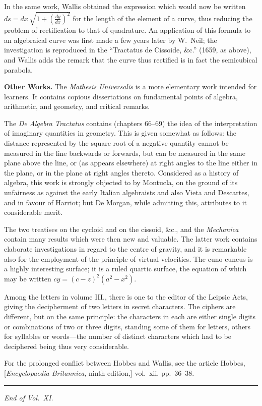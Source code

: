 \documentclass[11pt,a4paper]{article}
\begin{document}
In the same work, Wallis obtained the expression which would now be written $ds = dx\,\sqrt{1 + (\frac{dy}{dx})^{2}}$ for the length of the element of a curve, thus reducing the problem of rectification to that of quadrature. An application of this formula to an algebraical curve was first made a few years later by W.~Neil; the investigation is reproduced in the ``Tractatus de Cissoide, \&c.'' (1659, as above), and Wallis adds the remark that the curve thus rectified is in fact the semicubical parabola.

\textbf{Other Works.}\quad
The \textit{Mathesis Universalis} is a more elementary work intended for learners. It contains copious dissertations on fundamental points of algebra, arithmetic, and geometry, and critical remarks.

The \textit{De Algebra Tractatus} contains (chapters 66--69) the idea of the interpretation of imaginary quantities in geometry. This is given somewhat as follows: the distance represented by the square root of a negative quantity cannot be measured in the line backwards or forwards, but can be measured in the same plane above the line, or (as appears elsewhere) at right angles to the line either in the plane, or in the plane at right angles thereto. Considered as a history of algebra, this work is strongly objected to by Montucla, on the ground of its unfairness as against the early Italian algebraists and also Vieta and Descartes, and in favour of Harriot; but De Morgan, while admitting this, attributes to it considerable merit.

The two treatises on the cycloid and on the cissoid, \&c., and the \textit{Mechanica} contain many results which were then new and valuable. The latter work contains elaborate investigations in regard to the centre of gravity, and it is remarkable also for the employment of the principle of virtual velocities. The cuno-cuneus is a highly interesting surface; it is a ruled quartic surface, the equation of which may be written $cy = (c - z)^{2}(a^{2} - x^{2})$.

Among the letters in volume III., there is one to the editor of the Leipsic Acts, giving the decipherment of two letters in secret characters. The ciphers are different, but on the same principle: the characters in each are either single digits or combinations of two or three digits, standing some of them for letters, others for syllables or words---the number of distinct characters which had to be deciphered being thus very considerable.

For the prolonged conflict between Hobbes and Wallis, see the article Hobbes, [\textit{Encyclopaedia Britannica}, ninth edition,] vol.~xii. pp.~36--38.

\vspace{1em}
\hrule
\vspace{1em}

\begin{center}
\textit{End of Vol.~XI.}
\end{center}
\end{document}
